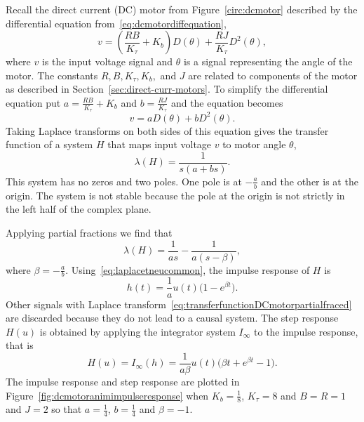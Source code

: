 \documentclass[11pt,a4paper]{book}
\theoremstyle{plain}
\numberwithin{equation}{section}
\begin{document}
Recall the direct current (DC) motor from Figure~\ref{circ:dcmotor} described by the differential equation from~\eqref{eq:dcmotordiffequation},
\[
v = \left(\frac{RB}{K_\tau} + K_b\right) D(\theta) + \frac{RJ}{K_\tau} D^2(\theta),
\]
where $v$ is the input voltage signal and $\theta$ is a signal representing the angle of the motor.  The constants $R,B,K_\tau,K_b,$ and $J$ are related to components of the motor as described in Section~\ref{sec:direct-curr-motors}.  To simplify the differential equation put $a = \tfrac{RB}{K_\tau} + K_b$ and $b=\tfrac{RJ}{K_\tau}$ and the equation becomes
\[
v = a D(\theta) + b D^2(\theta).
\]
Taking Laplace transforms on both sides of this equation gives the transfer function of a system $H$ that maps input voltage $v$ to motor angle $\theta$,
\[
\lambda(H) = \frac{1}{s(a + bs)}.
\]
This system has no zeros and two poles.  One pole is at $-\tfrac{a}{b}$ and the other is at the origin.  The system is not stable because the pole at the origin is not strictly in the left half of the complex plane.

Applying partial fractions we find that
\begin{equation}\label{eq:transferfunctionDCmotorpartialfraced}
\lambda(H) = \frac{1}{as} - \frac{1}{a(s - \beta)},
\end{equation}
where $\beta = -\tfrac{a}{b}$.  Using~\eqref{eq:laplacetneucommon}, the impulse response of $H$ is
\begin{equation}\label{eq:impulseresponseDCmotor}
h(t) = \frac{1}{a}u(t)\big( 1  - e^{\beta t} \big).
\end{equation}
Other signals with Laplace transform~\eqref{eq:transferfunctionDCmotorpartialfraced} are discarded because they do not lead to a causal system.  The step response $H(u)$ is obtained by applying the integrator system $I_\infty$ to the impulse response, that is
\[
H(u) = I_\infty(h) = \frac{1}{a\beta}u(t) \big( \beta t + e^{\beta t} - 1 \big).
\]
The impulse response and step response are plotted in Figure~\ref{fig:dcmotoranimimpulseresponse} when $K_b= \tfrac{1}{8}$, $K_\tau = 8$ and $B=R=1$ and $J=2$ so that $a = \tfrac{1}{4}$, $b=\tfrac{1}{4}$ and $\beta = -1$.

\end{document}
